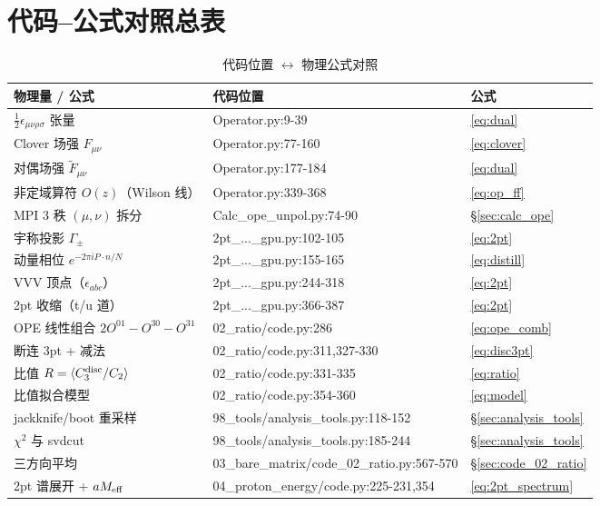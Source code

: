 \documentclass[UTF8,11pt]{ctexart}
\begin{document}
\section{代码--公式对照总表}
\label{sec:map}

\begin{table}[h]
\centering
\caption{代码位置 $\leftrightarrow$ 物理公式对照}
\begin{tabular}{@{}lll@{}}
\toprule
\textbf{物理量 / 公式} & \textbf{代码位置} & \textbf{公式} \\
\midrule
$\tfrac12\epsilon_{\mu\nu\rho\sigma}$ 张量 & Operator.py:9-39 & \eqref{eq:dual} \\
Clover 场强 $F_{\mu\nu}$ & Operator.py:77-160 & \eqref{eq:clover} \\
对偶场强 $\tilde F_{\mu\nu}$ & Operator.py:177-184 & \eqref{eq:dual} \\
非定域算符 $O(z)$（Wilson 线） & Operator.py:339-368 & \eqref{eq:op_ff} \\
MPI 3 秩 $(\mu,\nu)$ 拆分 & Calc\_ope\_unpol.py:74-90 & \S\ref{sec:calc_ope} \\
宇称投影 $\Gamma_\pm$ & 2pt\_...\_gpu.py:102-105 & \eqref{eq:2pt} \\
动量相位 $e^{-2\pi iP\cdot n/N}$ & 2pt\_...\_gpu.py:155-165 & \eqref{eq:distill} \\
VVV 顶点（$\epsilon_{abc}$） & 2pt\_...\_gpu.py:244-318 & \eqref{eq:2pt} \\
2pt 收缩（t/u 道） & 2pt\_...\_gpu.py:366-387 & \eqref{eq:2pt} \\
OPE 线性组合 $2O^{01}-O^{30}-O^{31}$ & 02\_ratio/code.py:286 & \eqref{eq:ope_comb} \\
断连 3pt + 减法 & 02\_ratio/code.py:311,327-330 & \eqref{eq:disc3pt} \\
比值 $R=\langle C_3^{\rm disc}/C_2\rangle$ & 02\_ratio/code.py:331-335 & \eqref{eq:ratio} \\
比值拟合模型 & 02\_ratio/code.py:354-360 & \eqref{eq:model} \\
jackknife/boot 重采样 & 98\_tools/analysis\_tools.py:118-152 & \S\ref{sec:analysis_tools} \\
$\chi^2$ 与 svdcut & 98\_tools/analysis\_tools.py:185-244 & \S\ref{sec:analysis_tools} \\
三方向平均 & 03\_bare\_matrix/code\_02\_ratio.py:567-570 & \S\ref{sec:code_02_ratio} \\
2pt 谱展开 + $aM_{\rm eff}$ & 04\_proton\_energy/code.py:225-231,354 & \eqref{eq:2pt_spectrum} \\

\end{tabular}
\end{table}
\end{document}
